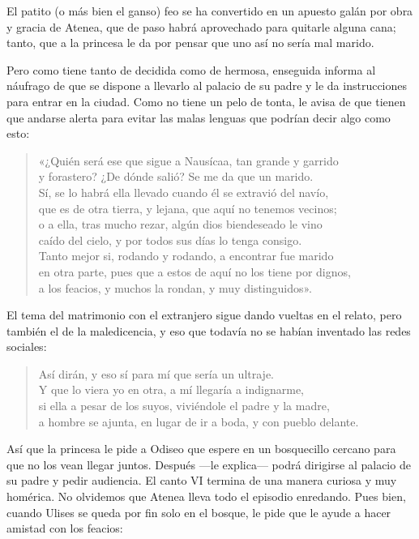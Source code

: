 \documentclass[11pt,a4paper]{article}
\begin{document}
El patito (o más bien el ganso) feo se ha convertido en un apuesto galán por obra y gracia de Atenea, que de paso habrá aprovechado para quitarle alguna cana; tanto, que a la princesa le da por pensar que uno así no sería mal marido.

Pero como tiene tanto de decidida como de hermosa, enseguida informa al náufrago de que se dispone a llevarlo al palacio de su padre y le da instrucciones para entrar en la ciudad. Como no tiene un pelo de tonta, le avisa de que tienen que andarse alerta para evitar las malas lenguas que podrían decir algo como esto:

\begin{verse}
«¿Quién será ese que sigue a Nausícaa, tan grande y garrido\\
y forastero? ¿De dónde salió? Se me da que un marido.\\
Sí, se lo habrá ella llevado cuando él se extravió del navío,\\
que es de otra tierra, y lejana, que aquí no tenemos vecinos;\\
o a ella, tras mucho rezar, algún dios biendeseado le vino\\
caído del cielo, y por todos sus días lo tenga consigo.\\
Tanto mejor si, rodando y rodando, a encontrar fue marido\\
en otra parte, pues que a estos de aquí no los tiene por dignos,\\
a los feacios, y muchos la rondan, y muy distinguidos».
\end{verse}


El tema del matrimonio con el extranjero sigue dando vueltas en el relato, pero también el de la maledicencia, y eso que todavía no se habían inventado las redes sociales:

\begin{verse}
Así dirán, y eso sí para mí que sería un ultraje.\\
Y que lo viera yo en otra, a mí llegaría a indignarme,\\
si ella a pesar de los suyos, viviéndole el padre y la madre,\\
a hombre se ajunta, en lugar de ir a boda, y con pueblo delante.
\end{verse}

Así que la princesa le pide a Odiseo que espere en un bosquecillo cercano para que no los vean llegar juntos. Después ---le explica--- podrá dirigirse al palacio de su padre y pedir audiencia. El canto VI termina de una manera curiosa y muy homérica. No olvidemos que Atenea lleva todo el episodio enredando. Pues bien, cuando Ulises se queda por fin solo en el bosque, le pide que le ayude a hacer amistad con los feacios:
\end{document}
